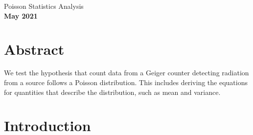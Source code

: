 \documentclass[12pt]{article}
\numberwithin{equation}{section}
\numberwithin{figure}{section}
\numberwithin{table}{section}
\begin{document}
\begin{center}
    {\huge Poisson Statistics Analysis}\\
    \vspace{0.2in}
    \textbf{May 2021}

    \section*{Abstract}
    We test the hypothesis that count data from a Geiger counter detecting radiation from a  source follows a Poisson distribution. This includes deriving the equations for quantities that describe the distribution, such as mean and variance. 

\end{center}

\section{Introduction}\label{sec:Introduction}
\end{document}
